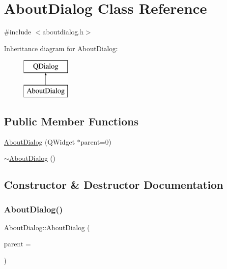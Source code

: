\hypertarget{class_about_dialog}{}\section{About\+Dialog Class Reference}
\label{class_about_dialog}


{\ttfamily \#include $<$aboutdialog.\+h$>$}

Inheritance diagram for About\+Dialog\+:\begin{figure}[H]
\begin{center}
\leavevmode
\includegraphics[height=2.000000cm]{d2/d6f/class_about_dialog}
\end{center}
\end{figure}
\subsection*{Public Member Functions}
\begin{DoxyCompactItemize}
\item 
\mbox{\hyperlink{class_about_dialog_ad96fc2ce8de7568ace543b7c69c71c56}{About\+Dialog}} (Q\+Widget $\ast$parent=0)
\item 
\mbox{\hyperlink{class_about_dialog_a3d87f5a26a175bb2573965c98af6d4ca}{$\sim$\+About\+Dialog}} ()
\end{DoxyCompactItemize}


\subsection{Constructor \& Destructor Documentation}
\mbox{\label{class_about_dialog_ad96fc2ce8de7568ace543b7c69c71c56}} 
\subsubsection{\texorpdfstring{AboutDialog()}{AboutDialog()}}
{\footnotesize\ttfamily About\+Dialog\+::\+About\+Dialog (\begin{DoxyParamCaption}\item[{Q\+Widget $\ast$}]{parent = {} }\end{DoxyParamCaption})\hspace{0.3cm}{\ttfamily [explicit]}}

